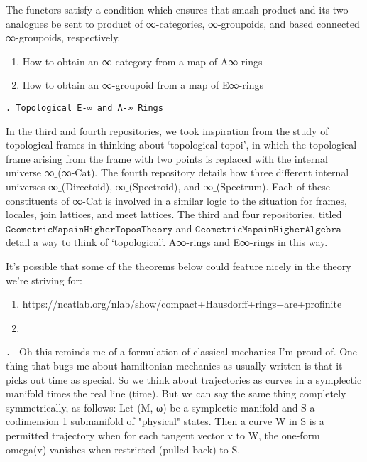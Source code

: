 \documentclass{book}
\newcounter{pcounter}
\newcounter{sectioncount}
\newcounter{subsectioncount}
\renewcommand{\subsection}[1]{\texttt{\thesubsectioncount . #1} \stepcounter{subsectioncount}}
\begin{document}
The functors satisfy a condition which ensures that smash product and its two analogues be sent to product of ∞-categories, ∞-groupoids, and based connected ∞-groupoids, respectively.\\

\begin{enumerate}
\item How to obtain an ∞-category from a map of A∞-rings
\item How to obtain an ∞-groupoid from a map of E∞-rings
\end{enumerate}


\subsection{Topological E-∞ and A-∞ Rings}

In the third and fourth repositories, we took inspiration from the study of topological frames in thinking about `topological topoi', in which the topological frame arising from the frame with two points is replaced with the internal universe ∞$\_$(∞-Cat). The fourth repository details how three different internal universes ∞$\_$(Directoid), ∞$\_$(Spectroid), and ∞$\_$(Spectrum). Each of these constituents of ∞-Cat is involved in a similar logic to the situation for frames, locales, join lattices, and meet lattices. The third and four repositories, titled $\texttt{GeometricMapsinHigherToposTheory}$ and $\texttt{GeometricMapsinHigherAlgebra}$ detail a way to think of `topological'. A∞-rings and E∞-rings in this way.

It's possible that some of the theorems below could feature nicely in the theory we're striving for:

\begin{enumerate}
\item https://ncatlab.org/nlab/show/compact+Hausdorff+rings+are+profinite
\item 
\end{enumerate}

\iffalse
\subsection{}
Oh this reminds me of a formulation of classical mechanics I'm proud of. One thing that bugs me about hamiltonian mechanics as usually written is that it picks out time as special. So we think about trajectories as curves in a symplectic manifold times the real line (time). But we can say the same thing completely symmetrically, as follows:
Let (M, ω) be a symplectic manifold and S a codimension 1 submanifold of "physical" states.  Then a curve W in S is a permitted trajectory when for each tangent vector v to W, the one-form omega(v) vanishes when restricted (pulled back) to S.
\end{document}
